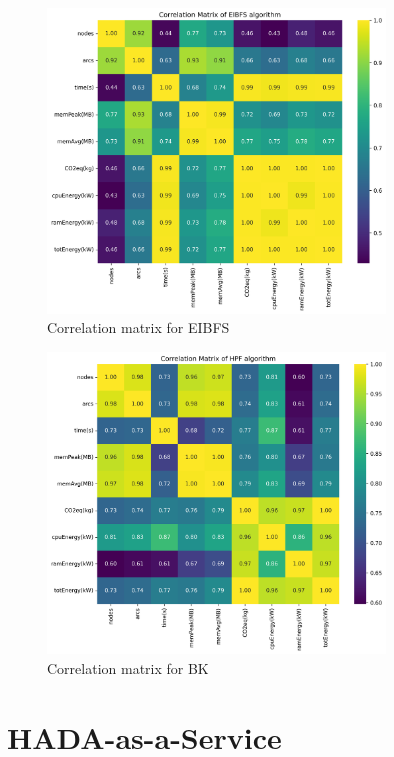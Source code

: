 \documentclass[a4paper,singleside,12pt]{report} %
\begin{document}
\begin{figure}[h!]
    \centering
    \includegraphics[width=0.8\textwidth]{imgs/eibfs_corr_mat.png}
    \caption{Correlation matrix for EIBFS}
    \label{fig:eibfs_corr_mat}
\end{figure}


\begin{figure}[h!]
    \centering
    \includegraphics[width=0.8\textwidth]{imgs/hpf_corr_mat.png}
    \caption{Correlation matrix for BK}
    \label{fig:hpf_flow_corr_mat}
\end{figure}

\chapter{HADA-as-a-Service}
\end{document}
